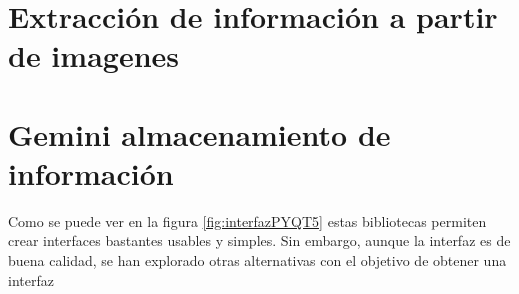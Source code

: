 \section{Extracción de información a partir de imagenes}
\label{sec:imagenes}

\section{Gemini almacenamiento de información}
Como se puede ver en la figura \ref{fig:interfazPYQT5} estas bibliotecas permiten crear interfaces bastantes usables y simples. Sin embargo, aunque la interfaz es de buena calidad, se han explorado otras alternativas con el objetivo de obtener una interfaz 


